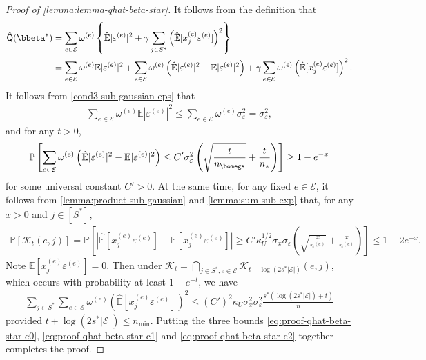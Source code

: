 \documentclass[10pt]{article}
\numberwithin{equation}{section}
\begin{document}
\begin{proof}[Proof of \cref{lemma:lemma-qhat-beta-star}]
It follows from the definition that
\begin{align*}
    \hat{\mathsf{Q}}(\bbeta^*) &= \sum_{e\in \mathcal{E}} \omega^{(e)} \left\{\hat{\mathbb{E}} |\varepsilon^{(e)}|^2 + \gamma \sum_{j\in S^*} \left(\hat{\mathbb{E}} [x_j^{(e)} \varepsilon^{(e)}]\right)^2\right\} \\
    &= \sum_{e\in \mathcal{E}} \omega^{(e)} \mathbb{E} |\varepsilon^{(e)}|^2 + \sum_{e\in \mathcal{E}} \omega^{(e)} \left(\hat{\mathbb{E}} |\varepsilon^{(e)}|^2 - {\mathbb{E}} |\varepsilon^{(e)}|^2\right) + \gamma \sum_{e\in \mathcal{E}} \omega^{(e)} \left(\hat{\mathbb{E}} [x_j^{(e)} \varepsilon^{(e)}]\right)^2.
\end{align*} It follows from \cref{cond3-sub-gaussian-eps} that
\begin{align}
\label{eq:proof-qhat-beta-star-c0}
    \sum_{e\in \mathcal{E}} \omega^{(e)} \mathbb{E} |\varepsilon^{(e)}|^2 \le \sum_{e\in \mathcal{E}} \omega^{(e)} \sigma_\varepsilon^2 = \sigma_\varepsilon^2,
\end{align} and for any $t>0$,
\begin{align}
\label{eq:proof-qhat-beta-star-c1}
    \mathbb{P}\left[\sum_{e\in \mathcal{E}} \omega^{(e)} \left(\hat{\mathbb{E}} |\varepsilon^{(e)}|^2 - {\mathbb{E}} |\varepsilon^{(e)}|^2\right) \le C' \sigma_\varepsilon^2 \left(\sqrt{\frac{t}{n_{\bomega}}} + \frac{t}{n_{*}}\right)\right] \ge 1-e^{-x}
\end{align} for some universal constant $C'>0$. At the same time, for any fixed $e\in \mathcal{E}$, it follows from \cref{lemma:product-sub-gaussian} and \cref{lemma:sum-sub-exp} that, for any $x>0$ and $j\in [S^*]$,
\begin{align*}
    \mathbb{P}[\mathcal{K}_{t}(e,j)] = \mathbb{P}\left[ \left|\hat{\mathbb{E}} [x_j^{(e)} \varepsilon^{(e)}] - \mathbb{E}[x_j^{(e)} \varepsilon^{(e)}]\right| \ge C' \kappa_U^{1/2}\sigma_x\sigma_\varepsilon \left(\sqrt{\frac{x}{n^{(e)}}} + \frac{x}{n^{(e)}}\right)\right] \le 1-2e^{-x}.
\end{align*} Note $\mathbb{E}[x_j^{(e)} \varepsilon^{(e)}] = 0$. Then under $\mathcal{K}_t = \bigcap_{j\in S^*, e\in \mathcal{E}} \mathcal{K}_{t+\log(2s^*|\mathcal{E}|)}(e,j)$, which occurs with probability at least $1-e^{-t}$, we have
\begin{align}
\label{eq:proof-qhat-beta-star-c2}
    \sum_{j\in S^*} \sum_{e\in \mathcal{E}} \omega^{(e)} \left(\hat{\mathbb{E}} [x_j^{(e)} \varepsilon^{(e)}] \right)^2 \le (C')^2 \kappa_U \sigma_x^2 \sigma_\varepsilon^2 \frac{s^*(\log(2s^*|\mathcal{E}|) + t)}{\bar{n}}
\end{align} provided $t+\log(2s^*|\mathcal{E}|) \le n_{\min}$. Putting the three bounds \eqref{eq:proof-qhat-beta-star-c0}, \eqref{eq:proof-qhat-beta-star-c1} and \eqref{eq:proof-qhat-beta-star-c2} together completes the proof.
\end{proof}
\end{document}
